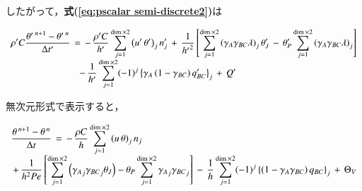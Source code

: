 %

%

\noindent したがって，\textbf{式(\ref{eq:pscalar semi-discrete2})}は

\begin{equation}
\begin{array}{l}
\displaystyle { \rho^{\prime}C \frac{ {\theta^{\prime}}^{\hspace{0.15em}n+1} - {\theta^{\prime}}^{\hspace{0.15em}n} } {\Delta t^{\prime}}
\,=\, 
-\, \frac{\rho^{\prime}C}{h^{\prime}} \sum\limits_{j=1}^{\dim\times2} {\left( u^{\prime}\,\theta^{\prime} \right)}_j \,n_j^{\prime}
\,+\,
\frac{1}{{h^{\prime}}^{2}} \left[ \sum\limits_{j=1}^{\dim\times2} \left( \gamma_{A}\gamma_{BC} \lambda \right)_{j} \theta_{J}^{\prime} 
\,-\, 
\theta_{P}^{\prime} \sum\limits_{j=1}^{\dim\times2} \left( \gamma_{A}\gamma_{BC} \lambda \right)_{j} \right] }\\
\displaystyle { \qquad \qquad \qquad \quad \,-\,
\frac{1}{h^{\prime}} \sum\limits_{j=1}^{\dim\times2} (-1)^{j} \left\{ \gamma_{A} \left( 1-\gamma_{BC} \right) q_{BC}^{\prime} \right\}_{j} \,+\, Q^{\prime} }
\end{array}
\label{eq:pscalar semi-discrete6}
\end{equation}


\noindent 無次元形式で表示すると，

\begin{equation}
\begin{array}{l}
\displaystyle { \frac{\theta^{\hspace{0.15em}n+1} - \theta^{\hspace{0.15em}n} } {\Delta t}
\, =\, -\, 
\frac{\rho C}{h} \sum\limits_{j=1}^{\dim\times2} {\left( u\,\theta \right)}_j \,n_j }\\
\displaystyle { \, + \,
\frac{1}{h^{2}Pe} \left[ \sum\limits_{j=1}^{\dim\times2} \left( {\gamma_{A}}_{j} {\gamma_{BC}}_{j} \theta_{J} \right)- \theta_{P} \sum\limits_{j=1}^{\dim\times2} {\gamma_{A}}_{j} {\gamma_{BC}}_{j} \right] 
\,-\,
\frac{1}{h} \sum\limits_{j=1}^{\dim\times2} (-1)^{j} \left\{ \left(1-\gamma_{A} \gamma_{BC} \right) q_{BC} \right\}_{j}
\,+\, \Theta_{V} }
\end{array}
\label{eq:pscalar semi-discrete7}
\end{equation}


